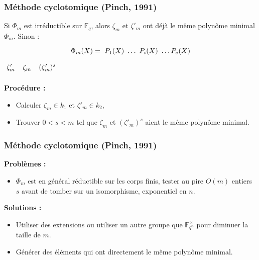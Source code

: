 \documentclass{beamer} %
\numberwithin{equation}{section}
\newcommand\GF[1]{\mathbb{F}_{#1}}
\begin{document}
\begin{frame}
\frametitle{Méthode cyclotomique (Pinch, 1991)}
Si $\Phi_m$ est irréductible sur $\GF{q}$, alors $\zeta_m$ et
$\zeta'_m$ ont déjà le même polynôme minimal $\Phi_m$. Sinon :
\begin{equation*}
\Phi_m(X) = \tikz[baseline]{\node[anchor=base] (t1) {$P_1(X)$};} \dots 
\tikz[baseline]{\node[anchor=base] (t2) {$P_i(X)$};}  
\dots P_e(X)
\end{equation*}
\hspace{3.5cm}
$\tikz\node [] (n1) {$\zeta'_m$};$
\hspace{0.8cm}
$\tikz\node [] (n2) {$\zeta_m$};$
\hspace{0.3cm}
$\tikz\node [] (n3) {$(\zeta'_m)^{s}$};$

\textbf{Procédure :}
\begin{itemize}
	\item Calculer $\zeta_m\in k_1$ et $\zeta'_m\in k_2$,
	\item Trouver $0 < s < m$ tel que $\zeta_m$ et $(\zeta'_m)^s$ aient
le même polynôme minimal.
\end{itemize}


\end{frame}
\begin{frame}
\frametitle{Méthode cyclotomique (Pinch, 1991)}
\textbf{Problèmes :}
\begin{itemize}
\item $\Phi_m$ est en général réductible sur les corps finis, tester au pire 
$O(m)$ entiers $s$ avant de tomber sur un isomorphisme, exponentiel en $n$.
\end{itemize}
\textbf{Solutions :}
\begin{itemize}
	\item Utiliser des extensions ou utiliser un autre groupe que
$\GF{q^n}^{\times}$
 pour diminuer la taille de $m$.
	\item Générer des éléments qui ont directement le même polynôme minimal.
\end{itemize}
\end{frame}
\end{document}
